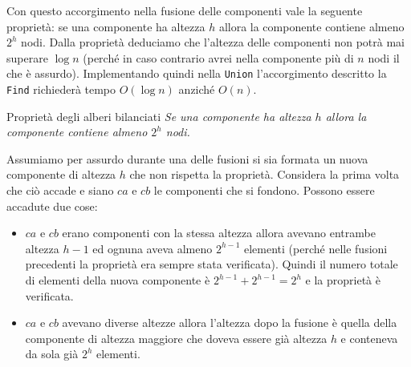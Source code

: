 Con questo accorgimento nella fusione delle componenti vale la seguente proprietà: se una componente ha altezza $h$ allora la componente contiene almeno $2^h$ nodi. Dalla proprietà deduciamo che l’altezza delle componenti non potrà mai superare $\log n$ (perché in caso contrario avrei nella componente più di $n$ nodi il che è assurdo). Implementando quindi nella \verb|Union| l’accorgimento descritto la \verb|Find| richiederà tempo $O(\log n)$ anziché $O(n)$.

\begin{Lemma}{Proprietà degli alberi bilanciati}{}
    \textit{Se una componente ha altezza $h$ allora la componente contiene almeno $2^h$ nodi.}

    \begin{demonstration}
        Assumiamo per assurdo durante una delle fusioni si sia formata un nuova componente di altezza $h$ che non rispetta la proprietà. Considera la prima volta che ciò accade e siano $ca$ e $cb$ le componenti che si fondono. Possono essere accadute due cose:
        \begin{itemize}
            \item $ca$ e $cb$ erano componenti con la stessa altezza allora avevano entrambe altezza $h-1$ ed ognuna aveva almeno $2^{h-1}$ elementi (perché nelle fusioni precedenti la proprietà era sempre stata verificata). Quindi il numero totale di elementi della nuova componente è $2^{h-1}+2^{h-1}=2^h$ e la proprietà è verificata.
            \item $ca$ e $cb$ avevano diverse altezze allora l’altezza dopo la fusione è quella della componente di altezza maggiore che doveva essere già altezza $h$ e conteneva da sola già $2^h$ elementi.
        \end{itemize}
    \end{demonstration}
\end{Lemma}